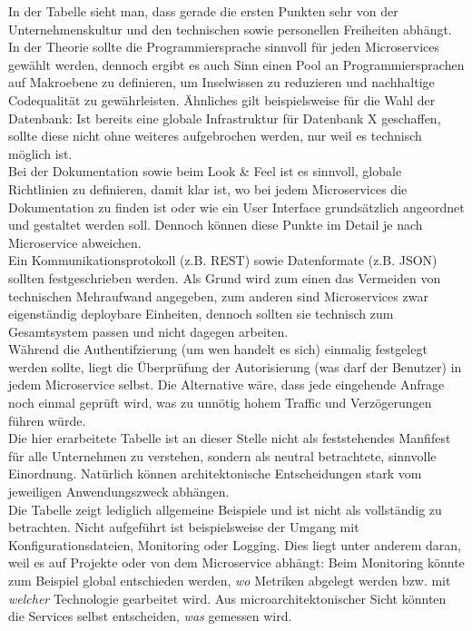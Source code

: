 In der Tabelle sieht man, dass gerade die ersten Punkten sehr von der Unternehmenskultur und den technischen sowie personellen Freiheiten abhängt. In der Theorie sollte die Programmiersprache sinnvoll für jeden Microservices gewählt werden, dennoch ergibt es auch Sinn einen Pool an Programmiersprachen auf Makroebene zu definieren, um Inselwissen zu reduzieren und nachhaltige Codequalität zu gewährleisten. Ähnliches gilt beispielsweise für die Wahl der Datenbank: Ist bereits eine globale Infrastruktur für Datenbank X geschaffen, sollte diese nicht ohne weiteres aufgebrochen werden, nur weil es technisch möglich ist. \\

Bei der Dokumentation sowie beim Look \& Feel ist es sinnvoll, globale Richtlinien zu definieren, damit klar ist, wo bei jedem Microservices die Dokumentation zu finden ist oder wie ein User Interface grundsätzlich angeordnet und gestaltet werden soll. Dennoch können diese Punkte im Detail je nach Microservice abweichen. \\

Ein Kommunikationsprotokoll (z.B. REST) sowie Datenformate (z.B. JSON) sollten festgeschrieben werden.\cite{rewe2019mic_ppp} \cite{wolff2018mic_praxis} Als Grund wird zum einen das Vermeiden von technischen Mehraufwand angegeben, zum anderen sind Microservices zwar eigenständig deploybare Einheiten, dennoch sollten sie technisch zum Gesamtsystem passen und nicht dagegen arbeiten. \\

Während die Authentifzierung (um wen handelt es sich) einmalig festgelegt werden sollte, liegt die Überprüfung der Autorisierung (was darf der Benutzer) in jedem Microservice selbst. Die Alternative wäre, dass jede eingehende Anfrage noch einmal geprüft wird, was zu unnötig hohem Traffic und Verzögerungen führen würde.  \\


Die hier erarbeitete Tabelle ist an dieser Stelle nicht als feststehendes Manfifest für alle Unternehmen zu verstehen, sondern als neutral betrachtete, sinnvolle Einordnung. Natürlich können architektonische Entscheidungen stark vom jeweiligen Anwendungszweck abhängen. \\

Die Tabelle zeigt lediglich allgemeine Beispiele und ist nicht als vollständig zu betrachten. Nicht aufgeführt ist beispielsweise der Umgang mit Konfigurationsdateien, Monitoring oder Logging. Dies liegt unter anderem daran, weil es auf Projekte oder von dem Microservice abhängt: Beim Monitoring könnte zum Beispiel global entschieden werden, \textit{wo} Metriken abgelegt werden bzw. mit \textit{welcher} Technologie gearbeitet wird. Aus microarchitektonischer Sicht könnten die Services selbst entscheiden, \textit{was} gemessen wird.  \\


